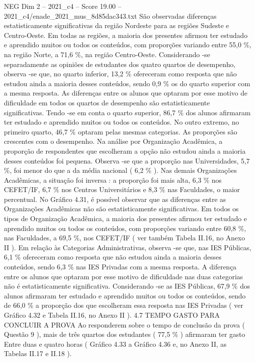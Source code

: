 \begin{textsample}{NEG Dim 2 – 2021\_c4 – Score 19.00 – 2021\_c4/enade\_2021\_mus\_8d85dac343.txt}
São observadas diferenças estatisticamente significativas da região Nordeste para as regiões Sudeste e Centro-Oeste.
Em todas as regiões, a maioria dos presentes afirmou ter estudado e aprendido muitos ou todos os conteúdos, com proporções variando entre 55,0 \%, na região Norte, a 71,6 \%, na região Centro-Oeste.
Considerando -se separadamente as opiniões de estudantes dos quatro quartos de desempenho, observa -se que, no quarto inferior, 13,2 \% ofereceram como resposta que não estudou ainda a maioria desses conteúdos, sendo 0,9 \% os do quarto superior com a mesma resposta.
As diferenças entre os alunos que optaram por esse motivo de dificuldade em todos os quartos de desempenho são estatisticamente significativas.
Tendo -se em conta o quarto superior, 86,7 \% dos alunos afirmaram ter estudado e aprendido muitos ou todos os conteúdos.
No outro extremo, no primeiro quarto, 46,7 \% optaram pelas mesmas categorias.
As proporções são crescentes com o desempenho.
Na análise por Organização Acadêmica, a proporção de respondentes que escolheram a opção não estudou ainda a maioria desses conteúdos foi pequena.
Observa -se que a proporção nas Universidades, 5,7 \%, foi menor do que a da média nacional ( 6,2 \% ).
Nas demais Organizações Acadêmicas, a situação foi inversa : a proporção foi mais alta, 6,3 \% nos CEFET/IF, 6,7 \% nos Centros Universitários e 8,3 \% nas Faculdades, o maior percentual.
No Gráfico 4.31, é possível observar que as diferenças entre as Organizações Acadêmicas não são estatisticamente significativas.
Em todos os tipos de Organização Acadêmica, a maioria dos presentes afirmou ter estudado e aprendido muitos ou todos os conteúdos, com proporções variando entre 60,8 \%, nas Faculdades, a 69,5 \%, nos CEFET/IF ( ver também Tabela II.16, no Anexo II ).
Em relação às Categorias Administrativas, observa -se que, nas IES Públicas, 6,1 \% ofereceram como resposta que não estudou ainda a maioria desses conteúdos, sendo 6,3 \% nas IES Privadas com a mesma resposta.
A diferença entre os alunos que optaram por esse motivo de dificuldade nas duas categorias não é estatisticamente significativa.
Considerando -se as IES Públicas, 67,9 \% dos alunos afirmaram ter estudado e aprendido muitos ou todos os conteúdos, sendo de 66,0 \% a proporção dos que escolheram essa resposta nas IES Privadas ( ver Gráfico 4.32 e Tabela II.16, no Anexo II ). 4.7 TEMPO GASTO PARA CONCLUIR A PROVA Ao responderem sobre o tempo de conclusão da prova ( Questão 9 ), mais de três quartos dos estudantes ( 77,5 \% ) afirmaram ter gasto Entre duas e quatro horas ( Gráfico 4.33 a Gráfico 4.36 e, no Anexo II, as Tabelas II.17 e II.18 ).

\end{textsample}
